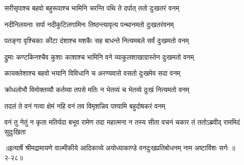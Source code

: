 \twolineshloka
{सरीसृपाश्च बहवो बहुरूपाश्च भामिनि}
{चरन्ति पथि ते दर्पात् ततो दुःखतरं वनम्} %

\twolineshloka
{नदीनिलयनाः सर्पा नदीकुटिलगामिनः}
{तिष्ठन्त्यावृत्य पन्थानमतो दुःखतरंवनम्} %

\twolineshloka
{पतङ्गा वृश्चिकाः कीटा दंशाश्च मशकैः सह}
{बाधन्ते नित्यमबले सर्वं दुःखमतो वनम्} %

\twolineshloka
{द्रुमाः कण्टकिनश्चैव कुशाः काशाश्च भामिनि}
{वने व्याकुलशाखाग्रास्तेन दुःखमतो वनम्} %

\twolineshloka
{कायक्लेशाश्च बहवो भयानि विविधानि च}
{अरण्यवासे वसतो दुःखमेव सदा वनम्} %

\twolineshloka
{क्रोधलोभौ विमोक्तव्यौ कर्तव्या तपसे मतिः}
{न भेतव्यं च भेतव्ये दुःखं नित्यमतो वनम्} %

\twolineshloka
{तदलं ते वनं गत्वा क्षेमं नहि वनं तव}
{विमृशन्निव पश्यामि बहुदोषकरं वनम्} %

\twolineshloka
{वनं तु नेतुं न कृता मतिर्यदा बभूव रामेण तदा महात्मना}
{न तस्य सीता वचनं चकार तं ततोऽब्रवीद् राममिदं सुदुःखिता} %


॥इत्यार्षे श्रीमद्रामायणे वाल्मीकीये आदिकाव्ये अयोध्याकाण्डे वनदुःखप्रतिबोधनम् नाम अष्टाविंशः सर्गः ॥२-२८॥
